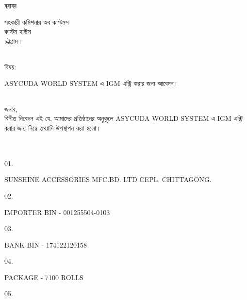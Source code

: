 \documentclass[12pt]{article}
\begin{document}
\noindent
বরাবর
\\
\begin{minipage}[t]{0.06\linewidth}
\hspace{1em}
\end{minipage}
\begin{minipage}[t]{0.94\linewidth}
সহকারী কমিশনার অব কাস্টমস
\\
কাস্টম হাউস
\\
চট্টগ্রাম।
\\
\\
\end{minipage}
\begin{minipage}[t]{0.06\linewidth}
বিষয়:
\end{minipage}
\begin{minipage}[t]{0.94\linewidth}
ASYCUDA WORLD SYSTEM এ IGM এন্ট্রি করার জন্য আবেদন।
\\
\\
\end{minipage}
জনাব,
\\
\hspace*{2.7em}বিনীত নিবেদন এই যে, আমাদের 
প্রতিষ্ঠানের অনুকূলে
ASYCUDA WORLD SYSTEM এ IGM এন্ট্রি করার জন্য নিম্নে তথ্যাদি
উপস্থাপন করা হলো।
\\
\\
\\
\begin{minipage}{0.05\linewidth}
01.
\end{minipage}
\begin{minipage}{0.95\linewidth}
SUNSHINE ACCESSORIES MFC.BD. LTD CEPL. CHITTAGONG.
\end{minipage}
\begin{minipage}{0.05\linewidth}
02.
\end{minipage}
\begin{minipage}{0.95\linewidth}
IMPORTER BIN - 001255504-0103
\end{minipage}
\begin{minipage}{0.05\linewidth}
03.
\end{minipage}
\begin{minipage}{0.95\linewidth}
BANK BIN - 174122120158
\end{minipage}
\begin{minipage}{0.05\linewidth}
04.
\end{minipage}
\begin{minipage}{0.95\linewidth}
PACKAGE - 7100 ROLLS
\end{minipage}
\begin{minipage}{0.05\linewidth}
05.
\end{minipage}
\end{document}
